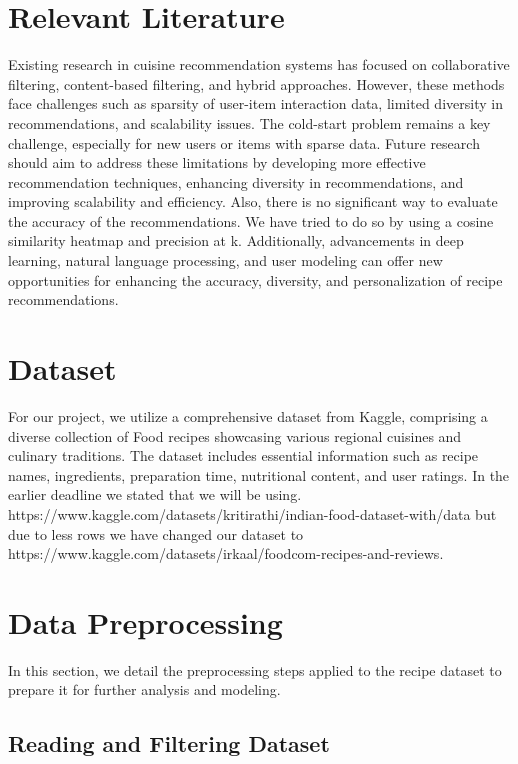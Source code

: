\documentclass[conference]{IEEEtran}
\begin{document}
\section{Relevant Literature}

Existing research in cuisine recommendation systems has focused on collaborative filtering, content-based filtering, and hybrid approaches. However, these methods face challenges such as sparsity of user-item interaction data, limited diversity in recommendations, and scalability issues. The cold-start problem remains a key challenge, especially for new users or items with sparse data. Future research should aim to address these limitations by developing more effective recommendation techniques, enhancing diversity in recommendations, and improving scalability and efficiency. Also, there is no significant way to evaluate the accuracy of the recommendations. We have tried to do so by using a cosine similarity heatmap and precision at k. Additionally, advancements in deep learning, natural language processing, and user modeling can offer new opportunities for enhancing the accuracy, diversity, and personalization of recipe recommendations.

\section{Dataset}
For our project, we utilize a comprehensive dataset from Kaggle, comprising a diverse collection of Food recipes showcasing various regional cuisines and culinary traditions. The dataset includes essential information such as recipe names, ingredients, preparation time, nutritional content, and user ratings. In the earlier deadline we stated that we will be using.
https://www.kaggle.com/datasets/kritirathi/indian-food-dataset-with/data
but due to less rows we have changed our dataset to https://www.kaggle.com/datasets/irkaal/foodcom-recipes-and-reviews.

\section{Data Preprocessing}

In this section, we detail the preprocessing steps applied to the recipe dataset to prepare it for further analysis and modeling.

\subsection{Reading and Filtering Dataset}
\end{document}
